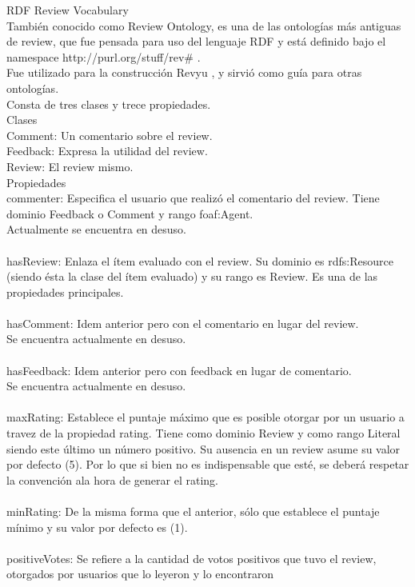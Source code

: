 RDF Review Vocabulary\\
También conocido como Review Ontology, es una de las ontologías más antiguas de review, que fue pensada para uso del lenguaje 
RDF y está definido bajo el namespace http://purl.org/stuff/rev# .\\
Fue utilizado para la construcción Revyu , y sirvió como guía para otras ontologías.\\
Consta de tres clases y trece propiedades.\\
Clases\\
Comment: Un comentario sobre el review. \\
Feedback: Expresa la utilidad del review. \\
Review: El review mismo. \\
Propiedades\\
commenter: Especifica el usuario que realizó el comentario del review. Tiene dominio Feedback o Comment y rango foaf:Agent.\\
Actualmente se encuentra en desuso.\\
\\
hasReview: Enlaza el ítem evaluado con el review. Su dominio es rdfs:Resource (siendo ésta la clase del ítem evaluado) y su rango es Review. Es una de 
las propiedades principales. \\
\\
hasComment: Idem anterior pero con el comentario en lugar del review.\\
Se encuentra actualmente en desuso.\\
\\
hasFeedback: Idem anterior pero con feedback en lugar de comentario.\\
Se encuentra actualmente en desuso.\\
\\
maxRating: Establece el puntaje máximo que es posible otorgar por un usuario a travez de la propiedad rating. Tiene como dominio 
Review y como rango Literal siendo este último un número positivo. Su ausencia en un review asume su valor por defecto (5). Por lo que 
si bien no es indispensable que esté, se deberá respetar la convención ala hora de generar el rating.\\
\\
minRating: De la misma forma que el anterior, sólo que establece el puntaje mínimo y su valor por defecto es (1).\\
\\
positiveVotes: Se refiere a la cantidad de votos positivos que tuvo el review, otorgados por usuarios que lo leyeron y lo encontraron 
